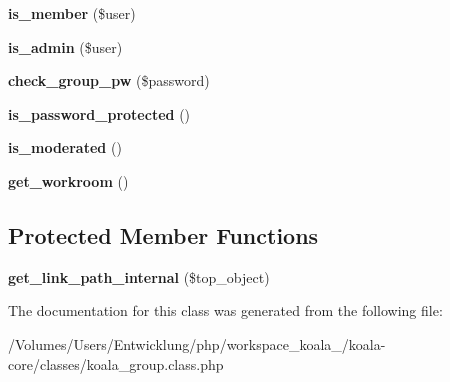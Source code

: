 \begin{DoxyCompactItemize}
\item 
\hypertarget{classkoala__group_ae2c2132d6ce74096b97d72ddfab261e3}{
{\bfseries is\_\-member} (\$user)}
\label{classkoala__group_ae2c2132d6ce74096b97d72ddfab261e3}

\item 
\hypertarget{classkoala__group_a4a0e814d4f4caacd4b5bf36b300f62e2}{
{\bfseries is\_\-admin} (\$user)}
\label{classkoala__group_a4a0e814d4f4caacd4b5bf36b300f62e2}

\item 
\hypertarget{classkoala__group_a88075e02aa8b3f8752cdb1fa586fdfc0}{
{\bfseries check\_\-group\_\-pw} (\$password)}
\label{classkoala__group_a88075e02aa8b3f8752cdb1fa586fdfc0}

\item 
\hypertarget{classkoala__group_ab9fca4ae673c278bf002af093c977bac}{
{\bfseries is\_\-password\_\-protected} ()}
\label{classkoala__group_ab9fca4ae673c278bf002af093c977bac}

\item 
\hypertarget{classkoala__group_a39fb5d1cd95e85a95e4d21b738716249}{
{\bfseries is\_\-moderated} ()}
\label{classkoala__group_a39fb5d1cd95e85a95e4d21b738716249}

\item 
\hypertarget{classkoala__group_ab01648aeec88fe7fa2cb11251e4daef1}{
{\bfseries get\_\-workroom} ()}
\label{classkoala__group_ab01648aeec88fe7fa2cb11251e4daef1}

\end{DoxyCompactItemize}
\subsection*{Protected Member Functions}
\begin{DoxyCompactItemize}
\item 
\hypertarget{classkoala__group_af94f6a8c465a792e59aea7d7b1e1e0bd}{
{\bfseries get\_\-link\_\-path\_\-internal} (\$top\_\-object)}
\label{classkoala__group_af94f6a8c465a792e59aea7d7b1e1e0bd}

\end{DoxyCompactItemize}


The documentation for this class was generated from the following file:\begin{DoxyCompactItemize}
\item 
/Volumes/Users/Entwicklung/php/workspace\_\-koala\_/koala-\/core/classes/koala\_\-group.class.php\end{DoxyCompactItemize}
